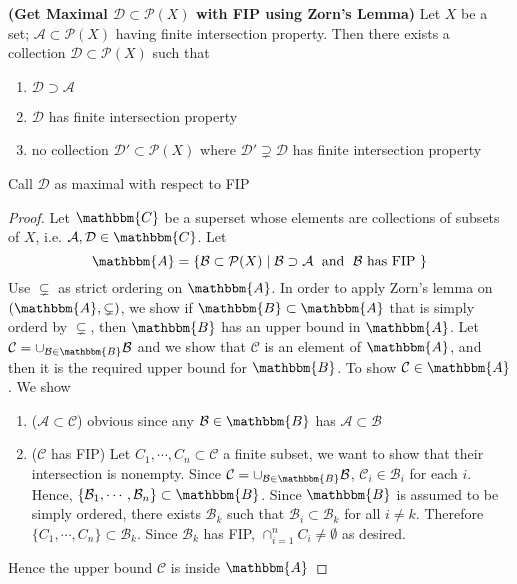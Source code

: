 \documentclass[10.5pt]{article}
\newcommand{\calA}{\mathcal{A}}
\newcommand{\calB}{\mathcal{B}}
\newcommand{\calC}{\mathcal{C}}
\newcommand{\calD}{\mathcal{D}}
\newcommand{\calP}{\mathcal{P}}
\begin{document}
\begin{lemma*}
    \textbf{(Get Maximal $\calD\subset\calP(X)$ with FIP using Zorn's Lemma)} Let $X$ be a set; $\calA \subset \calP(X)$ having finite intersection property. Then there exists a collection $\calD \subset\calP(X)$ such that
    \begin{enumerate}
        \item $\calD \supset \calA$
        \item $\calD$ has finite intersection property
        \item no collection $\calD'\subset\calP(X)$ where $\calD' \supsetneq \calD$ has finite intersection property
    \end{enumerate}
    Call $\calD$ as maximal with respect to FIP
    \begin{proof}
        Let $\mathbbm{C}$ be a superset whose elements are collections of subsets of $X$, i.e. $\calA,\calD\in \mathbbm{C}$. Let 
        \[
            \mathbbm{A} = \{ \calB\subset \calP(X) \mid \calB \supset \calA \;\text{ and }\; \calB \text{ has FIP } \}  
        \]
        Use $\subsetneq$ as strict ordering on $\mathbbm{A}$. In order to apply Zorn's lemma on $(\mathbbm{A}, \subsetneq)$, we show if $\mathbbm{B} \subset \mathbbm{A}$ that is simply orderd by $\subsetneq$, then $\mathbbm{B}$ has an upper bound in $\mathbbm{A}$. Let $\calC = \cup_{\calB \in \mathbbm{B}} \calB$ and we show that $\calC$ is an element of $\mathbbm{A}$, and then it is the required upper bound for $\mathbbm{B}$. To show $\calC \in \mathbbm{A}$. We show
        \begin{enumerate}
            \item ($\calA\subset\calC$) obvious since any $\calB\in\mathbbm{B}$ has $\calA \subset \calB$
            \item ($\calC$ has FIP) Let $C_1,\cdots,C_n\subset\calC$ a finite subset, we want to show that their intersection is nonempty. Since $\calC = \cup_{\calB\in\mathbbm{B}} \calB$, $\calC_i \in\calB_i$ for each $i$. Hence, $\{\calB_1, \cdots, \calB_n\} \subset\mathbbm{B}$. Since $\mathbbm{B}$ is assumed to be simply ordered, there exists $\calB_k$ such that $\calB_i \subset\calB_k$ for all $i\neq k$. Therefore $\{C_1, \cdots, C_n\}\subset \calB_k$. Since $\calB_k$ has FIP, $\cap_{i=1}^n C_i \neq \emptyset$ as desired.
        \end{enumerate}
        Hence the upper bound $\calC$ is inside $\mathbbm{A}$
    \end{proof}
\end{lemma*}
\end{document}
